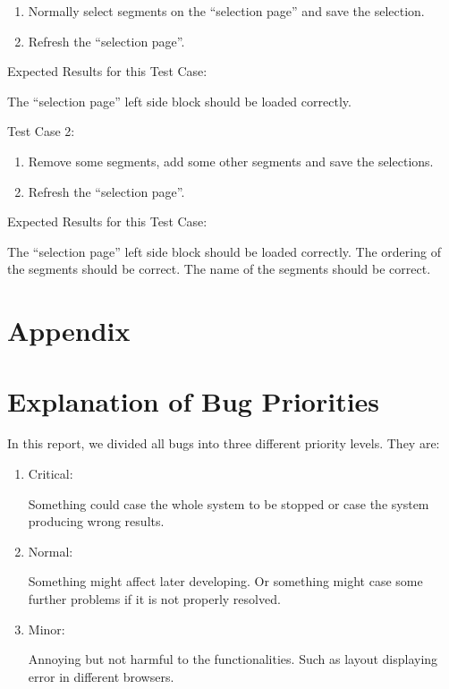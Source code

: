 \documentclass[twoside,a4paper]{refart}
\begin{document}
\begin{enumerate}
\item Normally select segments on the \enquote{selection page} and save the selection.
\item Refresh the \enquote{selection page}.
\end{enumerate}

Expected Results for this Test Case: 

The \enquote{selection page} left side block should be loaded correctly.

Test Case 2:

\begin{enumerate}
\item Remove some segments, add some other segments and save the selections.
\item Refresh the \enquote{selection page}.
\end{enumerate}

Expected Results for this Test Case: 

The \enquote{selection page} left side block should be loaded correctly. The ordering of the segments should be correct. The name of the segments should be correct.

\clearpage

\section*{Appendix}

\appendix

\section{Explanation of Bug Priorities}
In this report, we divided all bugs into three different priority levels. They are:

\begin{enumerate}
\item Critical:

Something could case the whole system to be stopped or case the system producing wrong results.

\item Normal:

Something might affect later developing. Or something might case some further problems if it is not properly resolved.

\item Minor:

Annoying but not harmful to the functionalities. Such as layout displaying error in different browsers.
\end{enumerate}
\end{document}
